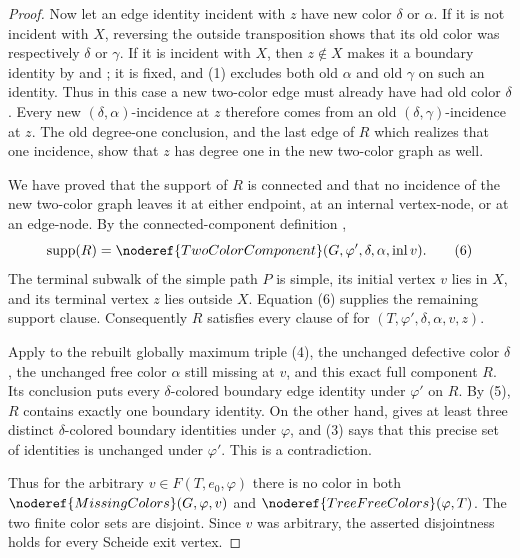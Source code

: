 \begin{proof}
Now let an edge identity incident with $z$ have new color $\delta$ or
$\alpha$.  If it is not incident with $X$, reversing the outside
transposition shows that its old color was respectively $\delta$ or
$\gamma$.  If it is incident with $X$, then $z\notin X$ makes it a
boundary identity by  and
; it is fixed, and (1) excludes both old
$\alpha$ and old $\gamma$ on such an identity.  Thus in this case a new
two-color edge must already have had old color $\delta$.  Every new
$(\delta,\alpha)$-incidence at $z$ therefore comes from an old
$(\delta,\gamma)$-incidence at $z$.  The old degree-one conclusion, and
the last edge of $R$ which realizes that one incidence, show that $z$ has
degree one in the new two-color graph as well.

We have proved that the support of $R$ is connected and that no incidence
of the new two-color graph leaves it at either endpoint, at an internal
vertex-node, or at an edge-node.  By the connected-component definition
,
\[
 \operatorname{supp}(R)=
 \noderef{TwoColorComponent}
   (G,\varphi',\delta,\alpha,\operatorname{inl}v).              \tag{6}
\]
The terminal subwalk of the simple path $P$ is simple, its initial vertex
$v$ lies in $X$, and its terminal vertex $z$ lies outside $X$.  Equation
(6) supplies the remaining support clause.  Consequently $R$ satisfies
every clause of  for
$(T,\varphi',\delta,\alpha,v,z)$.

Apply  to the rebuilt
globally maximum triple (4), the unchanged defective color $\delta$, the
unchanged free color $\alpha$ still missing at $v$, and this exact full
component $R$.  Its conclusion puts every $\delta$-colored boundary edge
identity under $\varphi'$ on $R$.  By (5), $R$ contains exactly one
boundary identity.  On the other hand,
 gives at least three distinct
$\delta$-colored boundary identities under $\varphi$, and (3) says that
this precise set of identities is unchanged under $\varphi'$.  This is a
contradiction.

Thus for the arbitrary $v\in F(T,e_0,\varphi)$ there is no color in both
$\noderef{MissingColors}(G,\varphi,v)$ and
$\noderef{TreeFreeColors}(\varphi,T)$.  The two finite color sets are
disjoint.  Since $v$ was arbitrary, the asserted disjointness holds for
every Scheide exit vertex.
\end{proof}
